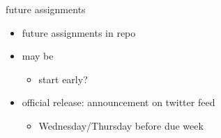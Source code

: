 \begin{frame}{future assignments}
    \begin{itemize}
    \item {} future assignments in repo
    \item may be 
        \begin{itemize}
        \item start early? 
        \end{itemize}
    \vspace{.5cm}
    \item official release: announcement on twitter feed
        \begin{itemize}
        \item Wednesday/Thursday before due week
        \end{itemize}
    \end{itemize}
\end{frame}

